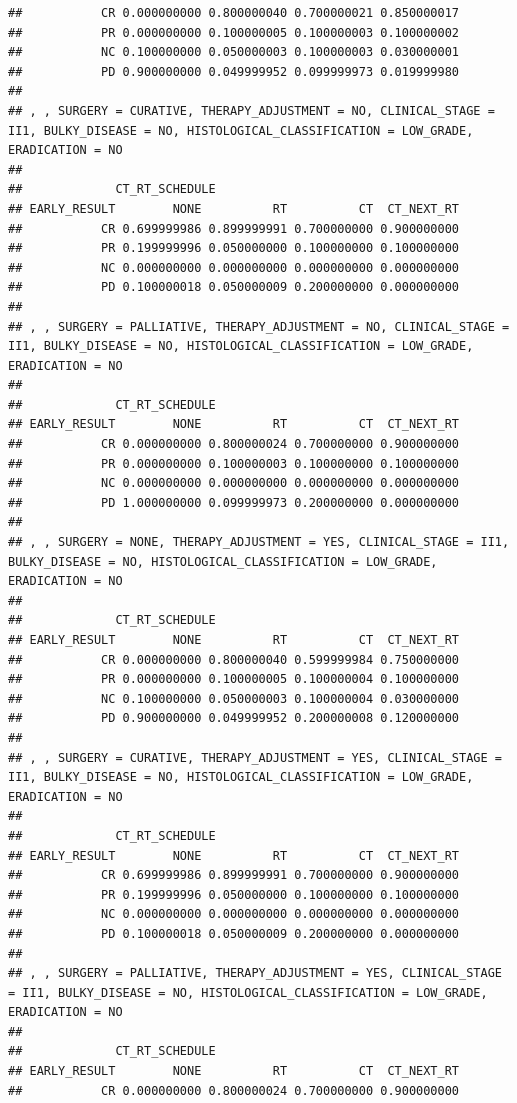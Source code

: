 \documentclass[]{article}
\begin{document}
\begin{verbatim}
##           CR 0.000000000 0.800000040 0.700000021 0.850000017
##           PR 0.000000000 0.100000005 0.100000003 0.100000002
##           NC 0.100000000 0.050000003 0.100000003 0.030000001
##           PD 0.900000000 0.049999952 0.099999973 0.019999980
## 
## , , SURGERY = CURATIVE, THERAPY_ADJUSTMENT = NO, CLINICAL_STAGE = II1, BULKY_DISEASE = NO, HISTOLOGICAL_CLASSIFICATION = LOW_GRADE, ERADICATION = NO
## 
##             CT_RT_SCHEDULE
## EARLY_RESULT        NONE          RT          CT  CT_NEXT_RT
##           CR 0.699999986 0.899999991 0.700000000 0.900000000
##           PR 0.199999996 0.050000000 0.100000000 0.100000000
##           NC 0.000000000 0.000000000 0.000000000 0.000000000
##           PD 0.100000018 0.050000009 0.200000000 0.000000000
## 
## , , SURGERY = PALLIATIVE, THERAPY_ADJUSTMENT = NO, CLINICAL_STAGE = II1, BULKY_DISEASE = NO, HISTOLOGICAL_CLASSIFICATION = LOW_GRADE, ERADICATION = NO
## 
##             CT_RT_SCHEDULE
## EARLY_RESULT        NONE          RT          CT  CT_NEXT_RT
##           CR 0.000000000 0.800000024 0.700000000 0.900000000
##           PR 0.000000000 0.100000003 0.100000000 0.100000000
##           NC 0.000000000 0.000000000 0.000000000 0.000000000
##           PD 1.000000000 0.099999973 0.200000000 0.000000000
## 
## , , SURGERY = NONE, THERAPY_ADJUSTMENT = YES, CLINICAL_STAGE = II1, BULKY_DISEASE = NO, HISTOLOGICAL_CLASSIFICATION = LOW_GRADE, ERADICATION = NO
## 
##             CT_RT_SCHEDULE
## EARLY_RESULT        NONE          RT          CT  CT_NEXT_RT
##           CR 0.000000000 0.800000040 0.599999984 0.750000000
##           PR 0.000000000 0.100000005 0.100000004 0.100000000
##           NC 0.100000000 0.050000003 0.100000004 0.030000000
##           PD 0.900000000 0.049999952 0.200000008 0.120000000
## 
## , , SURGERY = CURATIVE, THERAPY_ADJUSTMENT = YES, CLINICAL_STAGE = II1, BULKY_DISEASE = NO, HISTOLOGICAL_CLASSIFICATION = LOW_GRADE, ERADICATION = NO
## 
##             CT_RT_SCHEDULE
## EARLY_RESULT        NONE          RT          CT  CT_NEXT_RT
##           CR 0.699999986 0.899999991 0.700000000 0.900000000
##           PR 0.199999996 0.050000000 0.100000000 0.100000000
##           NC 0.000000000 0.000000000 0.000000000 0.000000000
##           PD 0.100000018 0.050000009 0.200000000 0.000000000
## 
## , , SURGERY = PALLIATIVE, THERAPY_ADJUSTMENT = YES, CLINICAL_STAGE = II1, BULKY_DISEASE = NO, HISTOLOGICAL_CLASSIFICATION = LOW_GRADE, ERADICATION = NO
## 
##             CT_RT_SCHEDULE
## EARLY_RESULT        NONE          RT          CT  CT_NEXT_RT
##           CR 0.000000000 0.800000024 0.700000000 0.900000000

\end{verbatim}
\end{document}
